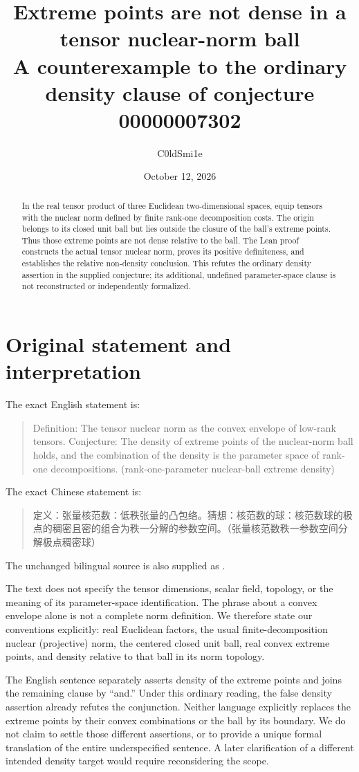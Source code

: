 \documentclass[11pt]{article}
\title{Extreme points are not dense in a tensor nuclear-norm ball\\
\large A counterexample to the ordinary density clause of conjecture 00000007302}
\author{C0ldSmi1e}
\date{October 12, 2026}
\newcommand{\code}[1]{\texttt{\detokenize{#1}}}
\begin{document}
\maketitle
\begin{abstract}
In the real tensor product of three Euclidean two-dimensional spaces, equip tensors
with the nuclear norm defined by finite rank-one decomposition costs. The origin
belongs to its closed unit ball but lies outside the closure of the ball's extreme
points. Thus those extreme points are not dense relative to the ball. The Lean
proof constructs the actual tensor nuclear norm, proves its positive definiteness,
and establishes the relative non-density conclusion. This refutes the ordinary
density assertion in the supplied conjecture; its additional, undefined
parameter-space clause is not reconstructed or independently formalized.
\end{abstract}

\section{Original statement and interpretation}
The exact English statement is:
\begin{quote}
Definition: The tensor nuclear norm as the convex envelope of low-rank tensors.
Conjecture: The density of extreme points of the nuclear-norm ball holds, and the
combination of the density is the parameter space of rank-one decompositions.
(rank-one-parameter nuclear-ball extreme density)
\end{quote}
The exact Chinese statement is:
\begin{quote}
定义：张量核范数：低秩张量的凸包络。猜想：核范数的球：核范数球的极点的稠密且密的组合为秩一分解的参数空间。（张量核范数秩一参数空间分解极点稠密球）
\end{quote}
The unchanged bilingual source is also supplied as \code{conjecture.md}.

The text does not specify the tensor dimensions, scalar field, topology, or
the meaning of its parameter-space identification. The phrase about a convex
envelope alone is not a complete norm definition. We therefore state our
conventions explicitly: real Euclidean factors, the usual finite-decomposition
nuclear (projective) norm, the centered closed unit ball, real convex extreme
points, and density relative to that ball in its norm topology.

The English sentence separately asserts density of the extreme points and joins
the remaining clause by ``and.'' Under this ordinary reading, the false density
assertion already refutes the conjunction. Neither language explicitly replaces
the extreme points by their convex combinations or the ball by its boundary.
We do not claim to settle those different assertions, or to provide a unique
formal translation of the entire underspecified sentence. A later clarification
of a different intended density target would require reconsidering the scope.
\end{document}

